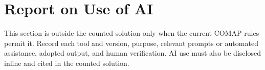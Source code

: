 \section*{Report on Use of AI}

This section is outside the counted solution only when the current COMAP rules
permit it. Record each tool and version, purpose, relevant prompts or automated
assistance, adopted output, and human verification. AI use must also be
disclosed inline and cited in the counted solution.
